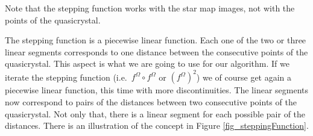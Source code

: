 \documentclass[text.tex]{subfiles}
\begin{document}
\begin{remark}
Note that the stepping function works with the star map images, not with the points of the quasicrystal. 
\end{remark}

The stepping function is a piecewise linear function. Each one of the two or three linear segments corresponds to one distance between the consecutive points of the quasicrystal. This aspect is what we are going to use for our algorithm. If we iterate the stepping function (i.e.~$f^\Omega\circ{}f^\Omega$ or $(f^\Omega)^2$) we of course get again a piecewise linear function, this time with more discontinuities. The linear segments now correspond to pairs of the distances between two consecutive points of the quasicrystal. Not only that, there is a linear segment for each possible pair of the distances. There is an illustration of the concept in Figure \ref{fig_steppingFunction}. 
\end{document}
